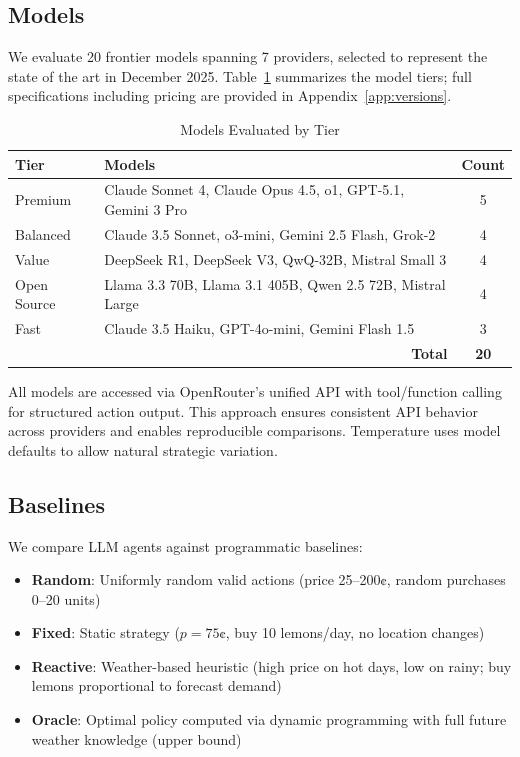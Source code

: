 \subsection{Models}
\label{sec:models}

We evaluate 20 frontier models spanning 7 providers, selected to represent the state of the art in December 2025. Table~\ref{tab:models} summarizes the model tiers; full specifications including pricing are provided in Appendix~\ref{app:versions}.

\begin{table}[h]
\centering
\caption{Models Evaluated by Tier}
\label{tab:models}
\small
\begin{tabular}{@{}p{2.5cm}p{6cm}c@{}}
\toprule
\textbf{Tier} & \textbf{Models} & \textbf{Count} \\
\midrule
Premium & Claude Sonnet 4, Claude Opus 4.5, o1, GPT-5.1, Gemini 3 Pro & 5 \\
Balanced & Claude 3.5 Sonnet, o3-mini, Gemini 2.5 Flash, Grok-2 & 4 \\
Value & DeepSeek R1, DeepSeek V3, QwQ-32B, Mistral Small 3 & 4 \\
Open Source & Llama 3.3 70B, Llama 3.1 405B, Qwen 2.5 72B, Mistral Large & 4 \\
Fast & Claude 3.5 Haiku, GPT-4o-mini, Gemini Flash 1.5 & 3 \\
\midrule
\multicolumn{2}{r}{\textbf{Total}} & \textbf{20} \\
\bottomrule
\end{tabular}
\end{table}

All models are accessed via OpenRouter's unified API with tool/function calling for structured action output. This approach ensures consistent API behavior across providers and enables reproducible comparisons. Temperature uses model defaults to allow natural strategic variation.

\subsection{Baselines}
\label{sec:baselines}

We compare LLM agents against programmatic baselines:

\begin{itemize}
    \item \textbf{Random}: Uniformly random valid actions (price 25--200¢, random purchases 0--20 units)
    \item \textbf{Fixed}: Static strategy ($p=75$¢, buy 10 lemons/day, no location changes)
    \item \textbf{Reactive}: Weather-based heuristic (high price on hot days, low on rainy; buy lemons proportional to forecast demand)
    \item \textbf{Oracle}: Optimal policy computed via dynamic programming with full future weather knowledge (upper bound)
\end{itemize}

